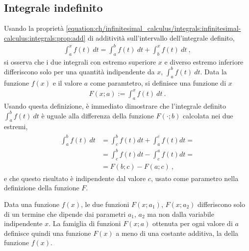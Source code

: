 \documentclass[letterpaper,10pt,italian]{jupyterBook}
\begin{document}
\subsection{Integrale indefinito}
\label{\detokenize{ch/infinitesimal_calculus/integrals:integrale-indefinito}}
\sphinxAtStartPar
Usando la proprietà \eqref{equation:ch/infinitesimal_calculus/integrals:infinitesimal-calculus:integrals:prop:add} di additività sull’intervallo dell’integrale definito,
\begin{equation*}
\begin{split}\int_a^x f(t) \ dt = \int_a^b f(t) \ dt + \int_b^x f(t) \ dt \ , \end{split}
\end{equation*}
\sphinxAtStartPar
si osserva che i due integrali con estremo superiore \(x\) e diverso estremo inferiore differiscono solo per una quantità indipendente da \(x\), \(\int_{a}^{b} f(t) \ dt\). Data la funzione \(f(x)\) e il valore \(a\) come paramtetro, si definisce una funzione di \(x\)
\begin{equation}\label{equation:ch/infinitesimal_calculus/integrals:infinitesimal-calculus:integrals:primi-}
\begin{split}F(x;a) := \int_a^x f(t) \ dt \ .\end{split}
\end{equation}
\sphinxAtStartPar
Usando questa definizione, è immediato dimostrare che l’integrale definito \(\int_{a}^{b} f(t) \ dt\) è uguale alla differenza della funzione \(F(\cdot; b)\) calcolata nei due estremi,
\begin{equation*}
\begin{split}\begin{aligned}
  \int_{a}^{b} f(t) \ dt & = \int_{c}^{b} f(t) dt + \int_{a}^{c} f(t) dt = \\ 
                         & = \int_{c}^{b} f(t) dt - \int_{c}^{a} f(t) dt = \\
                         & = F(b;c) - F(a;c) \ ,
\end{aligned}\end{split}
\end{equation*}
\sphinxAtStartPar
e che questo risultato è indipendente dal valore \(c\), usato come parametro nella definizione della funzione \(F\).

\sphinxAtStartPar
Data una funzione \(f(x)\), le due funzioni \(F(x;a_1)\), \(F(x;a_2)\) differiscono solo di un termine che dipende dai parametri \(a_1\), \(a_2\) ma non dalla variabile indipendente \(x\). La famiglia di funzioni \(F(x;a)\) ottenuta per ogni valore di \(a\) definisce quindi una funzione \(F(x)\) a meno di una costante additiva, la  della funzione \(f(x)\).
\end{document}
